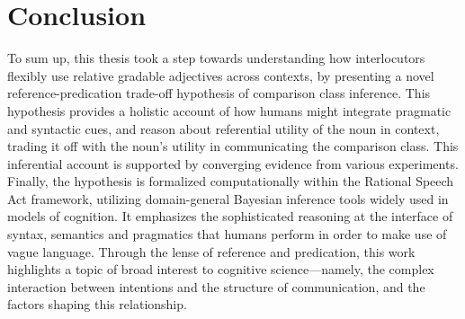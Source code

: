 \section{Conclusion}
To sum up, this thesis took a step towards understanding how interlocutors flexibly use relative gradable adjectives across contexts, by presenting a novel reference-predication trade-off hypothesis of comparison class inference. 
This hypothesis provides a holistic account of how %
humans might integrate pragmatic and syntactic cues, and reason about referential utility of the noun in context, trading it off with the noun's utility in communicating the comparison class. This inferential account is supported by converging evidence from various experiments. Finally, the hypothesis is formalized computationally within the Rational Speech Act framework, utilizing domain-general Bayesian inference tools widely used in models of cognition. %
It emphasizes the sophisticated reasoning at the interface of syntax, semantics and pragmatics that humans perform in order to make use of vague language. 
Through the lense of reference and predication, this work highlights a topic of broad interest to cognitive science---namely, the complex interaction between intentions and the structure of communication, and the factors shaping this relationship. %
